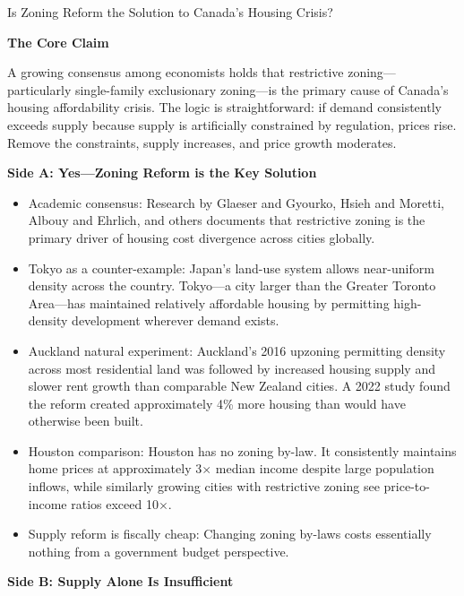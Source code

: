 \begin{policydebate}{Is Zoning Reform the Solution to Canada's Housing Crisis?}

\textbf{The Core Claim}

A growing consensus among economists holds that restrictive zoning---particularly single-family exclusionary zoning---is the primary cause of Canada's housing affordability crisis. The logic is straightforward: if demand consistently exceeds supply because supply is artificially constrained by regulation, prices rise. Remove the constraints, supply increases, and price growth moderates.

\vspace{8pt}
\textbf{Side A: Yes---Zoning Reform is the Key Solution}

\begin{itemize}
  \item Academic consensus: Research by Glaeser and Gyourko, Hsieh and Moretti, Albouy and Ehrlich, and others documents that restrictive zoning is the primary driver of housing cost divergence across cities globally.
  \item Tokyo as a counter-example: Japan's land-use system allows near-uniform density across the country. Tokyo---a city larger than the Greater Toronto Area---has maintained relatively affordable housing by permitting high-density development wherever demand exists.
  \item Auckland natural experiment: Auckland's 2016 upzoning permitting density across most residential land was followed by increased housing supply and slower rent growth than comparable New Zealand cities. A 2022 study found the reform created approximately 4\% more housing than would have otherwise been built.
  \item Houston comparison: Houston has no zoning by-law. It consistently maintains home prices at approximately 3$\times$ median income despite large population inflows, while similarly growing cities with restrictive zoning see price-to-income ratios exceed 10$\times$.
  \item Supply reform is fiscally cheap: Changing zoning by-laws costs essentially nothing from a government budget perspective.
\end{itemize}

\textbf{Side B: Supply Alone Is Insufficient}


\end{policydebate}
